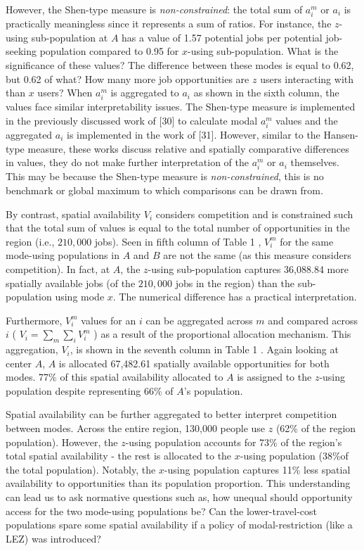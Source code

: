 \documentclass[10pt,letterpaper]{article}
\begin{document}
However, the Shen-type measure is \emph{non-constrained}: the total sum
of \(a_i^m\) or \(a_i\) is practically meaningless since it represents a
sum of ratios. For instance, the \(z\)-using sub-population at \(A\) has
a value of 1.57 potential jobs per potential job-seeking population
compared to 0.95 for \(x\)-using sub-population. What is the
significance of these values? The difference between these modes is
equal to 0.62, but 0.62 of what? How many more job opportunities are
\(z\) users interacting with than \(x\) users? When \(a_i^m\) is
aggregated to \(a_i\) as shown in the sixth column, the values face
similar interpretability issues. The Shen-type measure is implemented in
the previously discussed work of {[}30{]} to calculate modal \(a_i^m\)
values and the aggregated \(a_i\) is implemented in the work of
{[}31{]}. However, similar to the Hansen-type measure, these works
discuss relative and spatially comparative differences in values, they
do not make further interpretation of the \(a_i^m\) or \(a_i\)
themselves. This may be because the Shen-type measure is
\emph{non-constrained}, this is no benchmark or global maximum to which
comparisons can be drawn from.

By contrast, spatial availability \(V_i\) considers competition and is
constrained such that the total sum of values is equal to the total
number of opportunities in the region (i.e., \(210,000\) jobs). Seen in
fifth column of Table 1 , \(V_i^m\) for the same mode-using populations
in \(A\) and \(B\) are not the same (as this measure considers
competition). In fact, at \(A\), the \(z\)-using sub-population captures
36,088.84 more spatially available jobs (of the \(210,000\) jobs in the
region) than the sub-population using mode \(x\). The numerical
difference has a practical interpretation.

Furthermore, \(V_i^m\) values for an \(i\) can be aggregated across
\(m\) and compared across \(i\) ( \(V_i = \sum_m{\sum_i{V_i^m}}\) ) as a
result of the proportional allocation mechanism. This aggregation,
\(V_i\), is shown in the seventh column in Table 1 . Again looking at
center \(A\), \(A\) is allocated 67,482.61 spatially available
opportunities for both modes. 77\% of this spatial availability
allocated to \(A\) is assigned to the \(z\)-using population despite
representing 66\% of \(A\)'s population.

Spatial availability can be further aggregated to better interpret
competition between modes. Across the entire region, 130,000 people use
\(z\) (62\% of the region population). However, the \(z\)-using
population accounts for 73\% of the region's total spatial availability
- the rest is allocated to the \(x\)-using population (38\%of the total
population). Notably, the \(x\)-using population captures 11\% less
spatial availability to opportunities than its population proportion.
This understanding can lead us to ask normative questions such as, how
unequal should opportunity access for the two mode-using populations be?
Can the lower-travel-cost populations spare some spatial availability if
a policy of modal-restriction (like a LEZ) was introduced?
\end{document}
